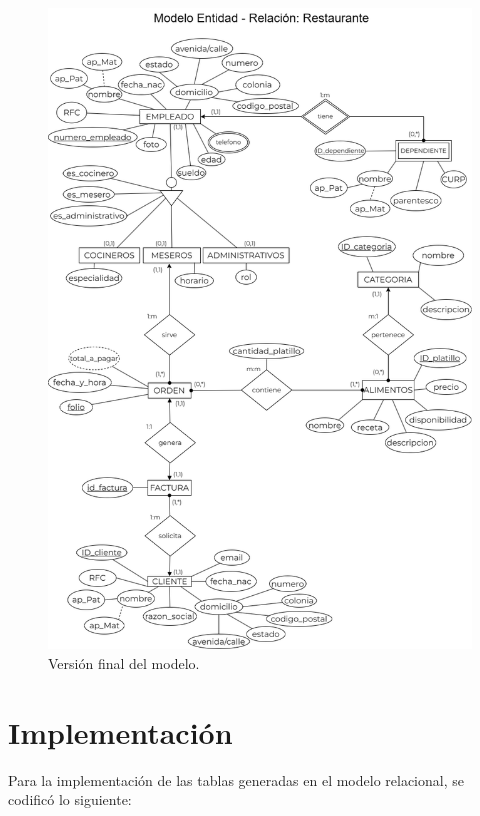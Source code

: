 \documentclass[12pt, letterpaper]{article} %
\begin{document}
\begin{figure}[h]
    \centering
    \includegraphics[scale=0.38]{Img/MER-Restaurante.png}
    \caption{Versión final del modelo.}
\end{figure}

\newpage
\section{Implementación}
Para la implementación de las tablas generadas en el modelo relacional, se codificó lo siguiente:
\end{document}
